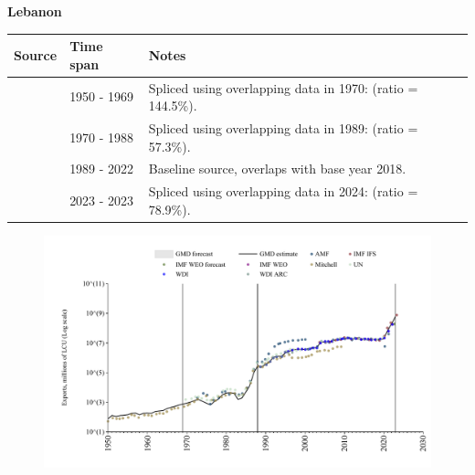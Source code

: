 \documentclass[12pt,a4paper,landscape]{article}
\begin{document}
\begin{adjustbox}{max totalsize={\paperwidth}{\paperheight},center}
\begin{minipage}[t][\textheight][t]{\textwidth}
\vspace*{0.5cm}
{}
\begin{center}
{\Large\bfseries Lebanon}
\end{center}
\vspace{0.5cm}
\begin{table}[H]
\centering
\small
\begin{tabular}{|l|l|l|}
\hline
\textbf{Source} & \textbf{Time span} & \textbf{Notes} \\
\hline
\rowcolor{white}\cite{Mitchell}& 1950 - 1969 &Spliced using overlapping data in 1970: (ratio = 144.5\%).\\
\rowcolor{lightgray}\cite{UN}& 1970 - 1988 &Spliced using overlapping data in 1989: (ratio = 57.3\%).\\
\rowcolor{white}\cite{WDI}& 1989 - 2022 &Baseline source, overlaps with base year 2018.\\
\rowcolor{lightgray}\cite{IMF_IFS}& 2023 - 2023 &Spliced using overlapping data in 2024: (ratio = 78.9\%).\\
\hline
\end{tabular}
\end{table}
\begin{figure}[H]
\centering
\includegraphics[width=\textwidth,height=0.6\textheight,keepaspectratio]{graphs/LBN_exports.pdf}
\end{figure}
\end{minipage}
\end{adjustbox}
\end{document}
